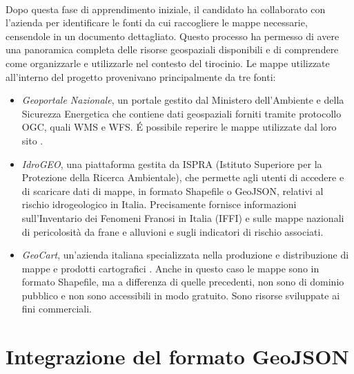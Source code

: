 \\Dopo questa fase di apprendimento iniziale, il candidato ha collaborato con l'azienda per identificare le fonti da cui raccogliere le mappe necessarie, censendole in un documento dettagliato. Questo processo ha permesso di avere una panoramica completa delle risorse geospaziali disponibili e di comprendere come organizzarle e utilizzarle nel contesto del tirocinio. Le mappe utilizzate all'interno del progetto provenivano principalmente da tre fonti:
\begin{itemize}
    \item \textit{Geoportale Nazionale}, un portale gestito dal Ministero dell'Ambiente e della Sicurezza Energetica che contiene dati geospaziali forniti tramite protocollo OGC, quali WMS e WFS. É possibile reperire le mappe utilizzate dal loro sito \cite{GeoPortaleNazionale}.
    \item \textit{IdroGEO}, una piattaforma gestita da ISPRA (Istituto Superiore per la Protezione della Ricerca Ambientale), che permette agli utenti di accedere e di scaricare dati di mappe, in formato Shapefile o GeoJSON, relativi al rischio idrogeologico in Italia. Precisamente fornisce informazioni sull'Inventario dei Fenomeni Franosi in Italia (IFFI) e sulle mappe nazionali di pericolosità da frane e alluvioni e sugli indicatori di rischio associati.
    \item \textit{GeoCart}, un'azienda italiana specializzata nella produzione e distribuzione di mappe e prodotti cartografici \cite{GeoCart}. Anche in questo caso le mappe sono in formato Shapefile, ma a differenza di quelle precedenti, non sono di dominio pubblico e non sono accessibili in modo gratuito. Sono risorse sviluppate ai fini commerciali.
\end{itemize}

\section{Integrazione del formato GeoJSON}

